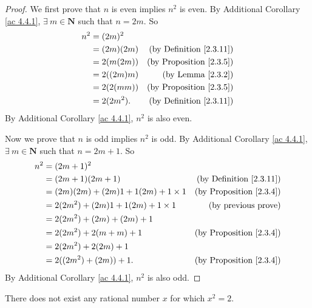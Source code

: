 \begin{proof}
    We first prove that \(n\) is even implies \(n^2\) is even.
    By Additional Corollary \ref{ac 4.4.1}, \(\exists\ m \in \mathbf{N}\) such that \(n = 2m\).
    So
    \begin{align*}
        n^2 & = (2m)^2                                         \\
            & = (2m)(2m) & \text{(by Definition \ref{2.3.11})} \\
            & = 2(m(2m)) & \text{(by Proposition \ref{2.3.5})} \\
            & = 2((2m)m) & \text{(by Lemma \ref{2.3.2})}       \\
            & = 2(2(mm)) & \text{(by Proposition \ref{2.3.5})} \\
            & = 2(2m^2). & \text{(by Definition \ref{2.3.11})}
    \end{align*}
    By Additional Corollary \ref{ac 4.4.1}, \(n^2\) is also even.

    Now we prove that \(n\) is odd implies \(n^2\) is odd.
    By Additional Corollary \ref{ac 4.4.1}, \(\exists\ m \in \mathbf{N}\) such that \(n = 2m + 1\).
    So
    \begin{align*}
        n^2 & = (2m + 1)^2                                                                  \\
            & = (2m + 1)(2m + 1)                      & \text{(by Definition \ref{2.3.11})} \\
            & = (2m)(2m) + (2m)1 + 1(2m) + 1 \times 1 & \text{(by Proposition \ref{2.3.4})} \\
            & = 2(2m^2) + (2m)1 + 1(2m) + 1 \times 1  & \text{(by previous prove)}          \\
            & = 2(2m^2) + (2m) + (2m) + 1                                                   \\
            & = 2(2m^2) + 2(m + m) + 1                & \text{(by Proposition \ref{2.3.4})} \\
            & = 2(2m^2) + 2(2m) + 1                                                         \\
            & = 2((2m^2) + (2m)) + 1.                 & \text{(by Proposition \ref{2.3.4})} \\
    \end{align*}
    By Additional Corollary \ref{ac 4.4.1}, \(n^2\) is also odd.
\end{proof}

\begin{proposition}\label{4.4.4}
    There does not exist any rational number \(x\) for which \(x^2 = 2\).
\end{proposition}

